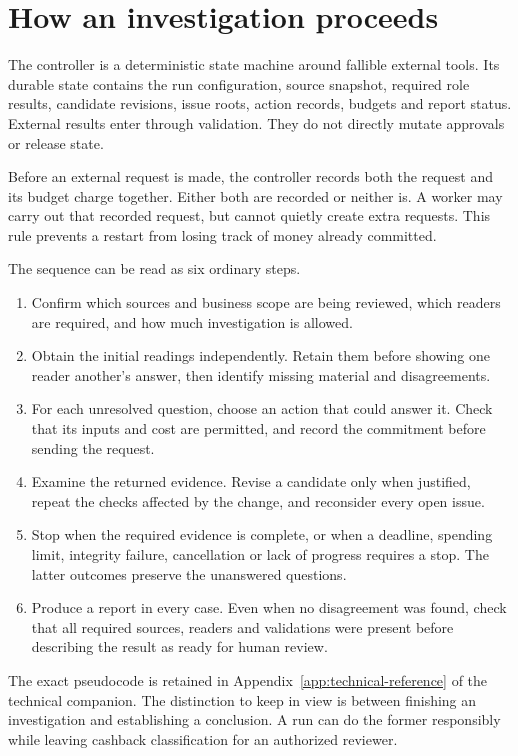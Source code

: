 \documentclass[12pt,a4paper,oneside,openany]{book}
\begin{document}
\section{How an investigation proceeds}
\label{merge:M06:15}


The controller is a deterministic state machine around fallible external tools.
Its durable state contains the run configuration, source snapshot, required role
results, candidate revisions, issue roots, action records, budgets and report
status. External results enter through validation. They do not directly mutate
approvals or release state.

Before an external request is made, the controller records both the request and
its budget charge together. Either both are recorded or neither is. A worker
may carry out that recorded request, but cannot quietly create extra requests.
This rule prevents a restart from losing track of money already committed.

The sequence can be read as six ordinary steps.
\begin{enumerate}
\item Confirm which sources and business scope are being reviewed, which readers
      are required, and how much investigation is allowed.
\item Obtain the initial readings independently. Retain them before showing one
      reader another's answer, then identify missing material and disagreements.
\item For each unresolved question, choose an action that could answer it. Check
      that its inputs and cost are permitted, and record the commitment before
      sending the request.
\item Examine the returned evidence. Revise a candidate only when justified,
      repeat the checks affected by the change, and reconsider every open issue.
\item Stop when the required evidence is complete, or when a deadline, spending
      limit, integrity failure, cancellation or lack of progress requires a stop.
      The latter outcomes preserve the unanswered questions.
\item Produce a report in every case. Even when no disagreement was found, check
      that all required sources, readers and validations were present before
      describing the result as ready for human review.
\end{enumerate}

The exact pseudocode is retained in Appendix~\ref{app:technical-reference} of the technical companion.
The distinction to keep in view is between finishing an investigation and
establishing a conclusion. A run can do the former responsibly while leaving
cashback classification for an authorized reviewer.
\end{document}
